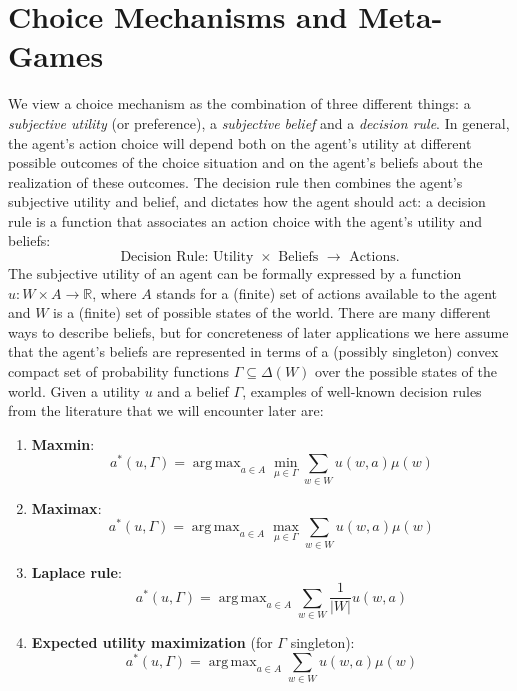 \documentclass[fleqn,reqno,12pt]{article}
\theoremstyle{Satz}
\theoremstyle{Bsp}
\DeclareMathOperator*{\argmax}{arg\,max}
\begin{document}
\section{Choice Mechanisms and Meta-Games} 
\label{sec:subj-ut,bel,dec-rules}


We view a choice mechanism as the combination of three different things: a \textit{subjective
  utility} (or preference), a \textit{subjective belief} and a \textit{decision rule}. In
general, the agent's action choice will depend both on the agent's utility at different
possible outcomes of the choice situation and on the agent's beliefs about the realization of
these outcomes. The decision rule then combines the agent's subjective utility and belief, and
dictates how the agent should act: a decision rule is a function that associates an action
choice with the agent's utility and beliefs:
$$ \text{Decision Rule: Utility }\times\text{ Beliefs } \rightarrow \text{ Actions.}  $$
The subjective utility of an agent can be formally expressed by a function
$u:W \times A \rightarrow \mathbb{R} $, where $A$ stands for a (finite) set of actions
available to the agent and $W$ is a (finite) set of possible states of the world. There are
many different ways to describe beliefs, but for concreteness of later applications we here
assume that the agent's beliefs are represented in terms of a (possibly singleton) convex compact set of
probability functions $\Gamma \subseteq \Delta(W) $ over the possible states of the
world. Given a utility $u$ and a belief $\Gamma$, examples of well-known decision rules from the literature that we will encounter later are:
\begin{enumerate}

\item \textbf{Maxmin}: $$ a^*(u,\Gamma)= \argmax_{a \in A} \min_{\mu \in \Gamma} \sum_{w\in W} u(w,a)  \mu(w)$$

\item \textbf{Maximax}: $$ a^*(u,\Gamma)= \argmax_{a \in A} \max_{\mu \in \Gamma} \sum_{w\in W} u(w,a)  \mu(w)$$

\item \textbf{Laplace rule}: $$ a^*(u,\Gamma)= \argmax_{a \in A} \sum_{w\in W} \frac{1}{|W|}  u(w,a) $$

\item \textbf{Expected utility maximization} (for $\Gamma$ singleton): $$ a^*(u,\Gamma)= \argmax_{a \in A} \sum_{w\in W} u(w,a)  \mu(w)$$

\end{enumerate}
\end{document}
